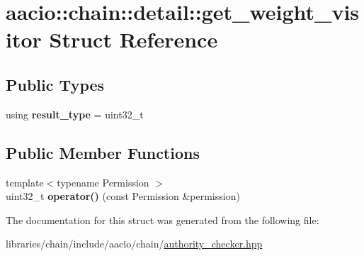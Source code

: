 \hypertarget{structaacio_1_1chain_1_1detail_1_1get__weight__visitor}{}\section{aacio\+:\+:chain\+:\+:detail\+:\+:get\+\_\+weight\+\_\+visitor Struct Reference}
\label{structaacio_1_1chain_1_1detail_1_1get__weight__visitor}
\subsection*{Public Types}
\begin{DoxyCompactItemize}
\item 
\mbox{\label{structaacio_1_1chain_1_1detail_1_1get__weight__visitor_a17e9a4fd578114ed421b88e8a5ce28d2}} 
using {\bfseries result\+\_\+type} = uint32\+\_\+t
\end{DoxyCompactItemize}
\subsection*{Public Member Functions}
\begin{DoxyCompactItemize}
\item 
\mbox{\label{structaacio_1_1chain_1_1detail_1_1get__weight__visitor_a051f98e78dac9ca3da4b89d640d71221}} 
{\footnotesize template$<$typename Permission $>$ }\\uint32\+\_\+t {\bfseries operator()} (const Permission \&permission)
\end{DoxyCompactItemize}


The documentation for this struct was generated from the following file\+:\begin{DoxyCompactItemize}
\item 
libraries/chain/include/aacio/chain/\mbox{\hyperlink{authority__checker_8hpp}{authority\+\_\+checker.\+hpp}}\end{DoxyCompactItemize}
